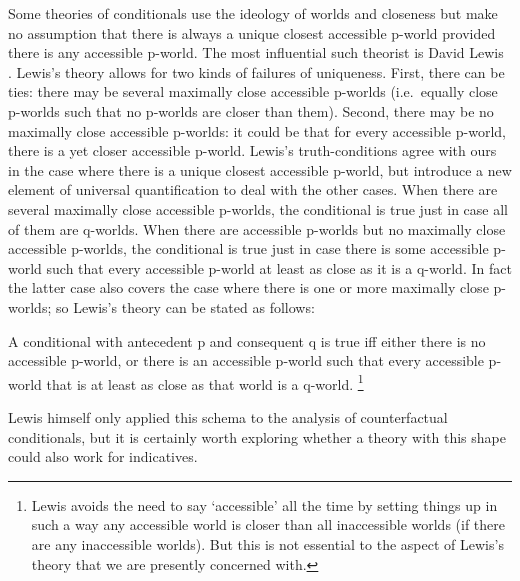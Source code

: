 \documentclass[If.tex]{subfiles}
\begin{document}
Some theories of conditionals use the ideology of worlds and closeness but make no assumption that there is always a unique closest accessible p-world provided there is any accessible p-world. The most influential such theorist is David Lewis \citeyearpar{LewisCounterfactuals}. Lewis's theory allows for two kinds of failures of uniqueness. First, there can be ties: there may be several maximally close accessible p-worlds (i.e.\ equally close p-worlds such that no p-worlds are closer than them). Second, there may be no maximally close accessible p-worlds: it could be that for every accessible p-world, there is a yet closer accessible p-world. Lewis's truth-conditions agree with ours in the case where there is a unique closest accessible p-world, but introduce a new element of universal quantification to deal with the other cases. When there are several maximally close accessible p-worlds, the conditional is true just in case all of them are q-worlds. When there are accessible p-worlds but no maximally close accessible p-worlds, the conditional is true just in case there is some accessible p-world such that every accessible p-world at least as close as it is a q-world. In fact the latter case also covers the case where there is one or more maximally close p-worlds; so Lewis's theory can be stated as follows:
\begin{prop}
\litem[LEWIS] \label{lewis}
	A conditional with antecedent p and consequent q is true iff either there is no accessible p-world, or there is an accessible p-world such that every accessible p-world that is at least as close as that world is a q-world.%
	\footnote{Lewis avoids the need to say ‘accessible’ all the time by setting things up in such a way any accessible world is closer than all inaccessible worlds (if there are any inaccessible worlds). But this is not essential to the aspect of Lewis's theory that we are presently concerned with.} 
\end{prop}
Lewis himself only applied this schema to the analysis of counterfactual conditionals, but it is certainly worth exploring whether a theory with this shape could also work for indicatives.
\end{document}
